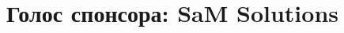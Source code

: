 \documentclass[10pt, a5paper]{article}
\begin{document}
\title{Голос спонсора: SaM Solutions}
\date{}
\maketitle

~

\newpage

~

\end{document}
